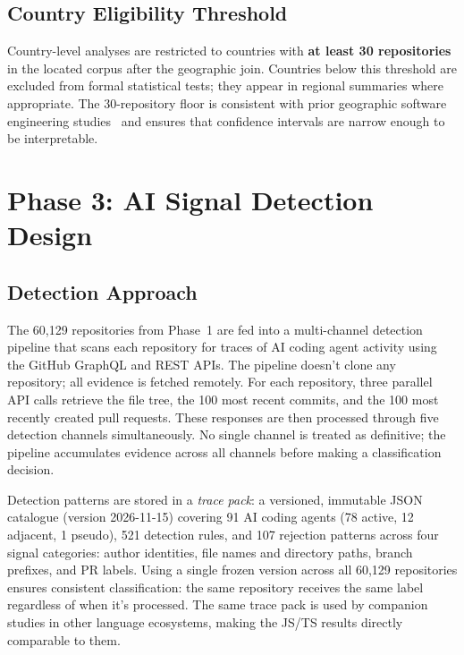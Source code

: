 \subsection{Country Eligibility Threshold}

Country-level analyses are restricted to countries with \textbf{at least 30 repositories} in the located corpus after the geographic join. Countries below this threshold are excluded from formal statistical tests; they appear in regional summaries where appropriate. The 30-repository floor is consistent with prior geographic software engineering studies~\cite{wachs2022, daniotti2025} and ensures that confidence intervals are narrow enough to be interpretable.

\section{Phase 3: AI Signal Detection Design}
\label{sec:meth:detection}

\subsection{Detection Approach}

The 60,129 repositories from Phase~1 are fed into a multi-channel detection pipeline that scans each repository for traces of AI coding agent activity using the GitHub GraphQL and REST APIs. The pipeline doesn't clone any repository; all evidence is fetched remotely. For each repository, three parallel API calls retrieve the file tree, the 100 most recent commits, and the 100 most recently created pull requests. These responses are then processed through five detection channels simultaneously. No single channel is treated as definitive; the pipeline accumulates evidence across all channels before making a classification decision.

Detection patterns are stored in a \emph{trace pack}: a versioned, immutable JSON catalogue (version 2026-11-15) covering 91 AI coding agents (78 active, 12 adjacent, 1 pseudo), 521 detection rules, and 107 rejection patterns across four signal categories: author identities, file names and directory paths, branch prefixes, and PR labels. Using a single frozen version across all 60,129 repositories ensures consistent classification: the same repository receives the same label regardless of when it's processed. The same trace pack is used by companion studies in other language ecosystems, making the JS/TS results directly comparable to them.

